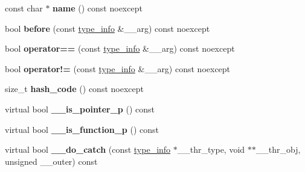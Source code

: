 \begin{DoxyCompactItemize}
\item 
\hypertarget{classstd_1_1type__info_afe60508ee089cebbd056bd50dfc7c3d7}{const char $\ast$ {\bfseries name} () const noexcept}\label{classstd_1_1type__info_afe60508ee089cebbd056bd50dfc7c3d7}

\item 
\hypertarget{classstd_1_1type__info_af2bf0c06826f33947ecd2854d0e2a3bc}{bool {\bfseries before} (const \hyperlink{classstd_1_1type__info}{type\+\_\+info} \&\+\_\+\+\_\+arg) const noexcept}\label{classstd_1_1type__info_af2bf0c06826f33947ecd2854d0e2a3bc}

\item 
\hypertarget{classstd_1_1type__info_a30078bc4dfd24fedee91bca264a0507c}{bool {\bfseries operator==} (const \hyperlink{classstd_1_1type__info}{type\+\_\+info} \&\+\_\+\+\_\+arg) const noexcept}\label{classstd_1_1type__info_a30078bc4dfd24fedee91bca264a0507c}

\item 
\hypertarget{classstd_1_1type__info_aaf0f927a29840cbfd0d1f2c435160c93}{bool {\bfseries operator!=} (const \hyperlink{classstd_1_1type__info}{type\+\_\+info} \&\+\_\+\+\_\+arg) const noexcept}\label{classstd_1_1type__info_aaf0f927a29840cbfd0d1f2c435160c93}

\item 
\hypertarget{classstd_1_1type__info_a4c297cf60f7d03092b7ba7632877eac9}{size\+\_\+t {\bfseries hash\+\_\+code} () const noexcept}\label{classstd_1_1type__info_a4c297cf60f7d03092b7ba7632877eac9}

\item 
\hypertarget{classstd_1_1type__info_a04a004605c917f1ba088cfac11955808}{virtual bool {\bfseries \+\_\+\+\_\+is\+\_\+pointer\+\_\+p} () const }\label{classstd_1_1type__info_a04a004605c917f1ba088cfac11955808}

\item 
\hypertarget{classstd_1_1type__info_a92e431500c93d1a7cb7952c5142ebadc}{virtual bool {\bfseries \+\_\+\+\_\+is\+\_\+function\+\_\+p} () const }\label{classstd_1_1type__info_a92e431500c93d1a7cb7952c5142ebadc}

\item 
\hypertarget{classstd_1_1type__info_affdcfba3b0a462785bba4d02bfa16335}{virtual bool {\bfseries \+\_\+\+\_\+do\+\_\+catch} (const \hyperlink{classstd_1_1type__info}{type\+\_\+info} $\ast$\+\_\+\+\_\+thr\+\_\+type, void $\ast$$\ast$\+\_\+\+\_\+thr\+\_\+obj, unsigned \+\_\+\+\_\+outer) const }\label{classstd_1_1type__info_affdcfba3b0a462785bba4d02bfa16335}


\end{DoxyCompactItemize}
